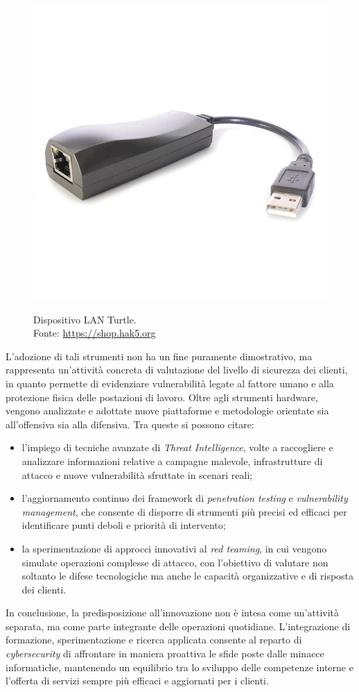 \begin{itemize}
\begin{figure}[H]
    \includegraphics[alt={LAN Turtle}, width=0.8\columnwidth]{img/lan-turtle_2000x.jpg}
    \caption{Dispositivo LAN Turtle.\\ Fonte: \url{https://shop.hak5.org}}
    \label{fig:lan-turtle}
    \end{figure}
\end{itemize}
L'adozione di tali strumenti non ha un fine puramente dimostrativo, ma rappresenta un'attività concreta di valutazione del livello di sicurezza dei clienti, in quanto permette di evidenziare vulnerabilità legate al fattore umano e alla protezione fisica delle postazioni di lavoro.  
Oltre agli strumenti hardware, vengono analizzate e adottate nuove piattaforme e metodologie orientate sia all'offensiva sia alla difensiva. Tra queste si possono citare:
\begin{itemize}
    \item l'impiego di tecniche avanzate di \textit{Threat Intelligence}, volte a raccogliere e analizzare informazioni relative a campagne malevole, infrastrutture di attacco e nuove vulnerabilità sfruttate in scenari reali;
    \item l'aggiornamento continuo dei framework di \textit{penetration testing} e \textit{vulnerability management}, che consente di disporre di strumenti più precisi ed efficaci per identificare punti deboli e priorità di intervento;
    \item la sperimentazione di approcci innovativi al \textit{red teaming}, in cui vengono simulate operazioni complesse di attacco, con l'obiettivo di valutare non soltanto le difese tecnologiche ma anche le capacità organizzative e di risposta dei clienti.
\end{itemize}
In conclusione, la predisposizione all'innovazione non è intesa come un'attività separata, ma come parte integrante delle operazioni quotidiane. L'integrazione di formazione, sperimentazione e ricerca applicata consente al reparto di \textit{cybersecurity} di affrontare in maniera proattiva le sfide poste dalle minacce informatiche, mantenendo un equilibrio tra lo sviluppo delle competenze interne e l'offerta di servizi sempre più efficaci e aggiornati per i clienti.
